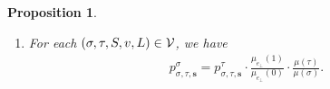 \documentclass[11pt]{article}
\newtheorem{proposition}[theorem]{Proposition}
\newcommand{\seqS}{\boldsymbol{s}}
\begin{document}
\begin{proposition}
\begin{enumerate}[(1)]
\begin{align}
            \end{align}
            Otherwise, we have
            \begin{align}\label{eqn-inner-child-sum3}
                p^{\sigma}_{\sigma,\tau, \seqS,e}=p^{\sigma \land (e\gets 0)}_{\sigma\land (e\gets 0),\tau\land (e\gets 0), \seqS\circ e}+p^{\sigma\land (e\gets 0)}_{\sigma\land (e\gets 0),\tau\land (e\gets 1), \seqS \circ e}, \quad  p^{\sigma}_{\sigma,\tau, \seqS,e}=p^{\sigma\land (e\gets 1)}_{\sigma\land (e\gets 1),\tau\land (e\gets 1), \seqS\circ e},
            \end{align}
            \begin{align}\label{eqn-inner-child-sum4}
                p^{\tau}_{\sigma,\tau, \seqS,e}=p^{\tau\land (e\gets 0)}_{\sigma\land (e\gets 0),\tau\land (e\gets 0), \seqS\circ e}, \quad  p^{\tau}_{\sigma,\tau,S,e}=p^{\tau\land (e\gets 1)}_{\sigma\land (e\gets 0),\tau\land (e\gets 1), \seqS \circ e} + p^{\tau \land (e\gets 1)}_{\sigma\land (e\gets 1),\tau\land (e\gets 1), \seqS\circ e}.
            \end{align}
            \item For each $(\sigma, \tau, S, v, L) \in \mathcal{V}$, we have
            \begin{align}\label{eqn-ratio}
            	{p^{\sigma}_{\sigma,\tau, \seqS}} = p^{\tau}_{\sigma,\tau, \seqS} \cdot \frac{\mu_{e_{\bot}}(1)}{\mu_{e_{\bot}}(0)}\cdot \frac{ \mu(\tau)}{ \mu(\sigma)}.
            \end{align}
        \end{enumerate}
    \end{proposition}
    
\end{document}
